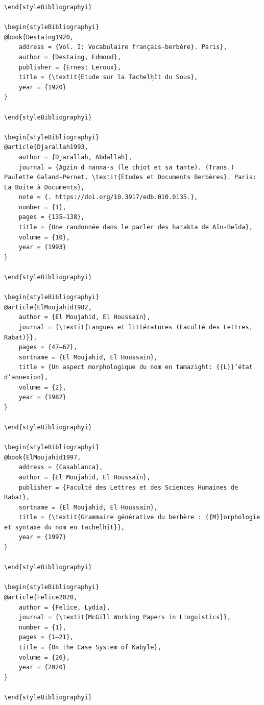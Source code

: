 \documentclass[output=paper]{langscibook}
\begin{document}
\begin{verbatim}
\end{styleBibliographyi}

\begin{styleBibliographyi}
@book{Destaing1920,
	address = {Vol. I: Vocabulaire français-berbère}. Paris},
	author = {Destaing, Edmond},
	publisher = {Ernest Leroux},
	title = {\textit{Etude sur la Tachelḥît du Sous},
	year = {1920}
}

\end{styleBibliographyi}

\begin{styleBibliographyi}
@article{Djarallah1993,
	author = {Djarallah, Abdallah},
	journal = {Agzin d nanna-s (le chiot et sa tante). (Trans.) Paulette Galand-Pernet. \textit{Études et Documents Berbères}. Paris: La Boite à Documents},
	note = {. https://doi.org/10.3917/edb.010.0135.},
	number = {1},
	pages = {135–138},
	title = {Une randonnée dans le parler des harakta de Aïn-Beïda},
	volume = {10},
	year = {1993}
}

\end{styleBibliographyi}

\begin{styleBibliographyi}
@article{ElMoujahid1982,
	author = {El Moujahid, El Houssaïn},
	journal = {\textit{Langues et littératures (Faculté des Lettres, Rabat)}},
	pages = {47–62},
	sortname = {El Moujahid, El Houssain},
	title = {Un aspect morphologique du nom en tamazight: {{L}}’état d’annexion},
	volume = {2},
	year = {1982}
}

\end{styleBibliographyi}

\begin{styleBibliographyi}
@book{ElMoujahid1997,
	address = {Casablanca},
	author = {El Moujahid, El Houssaïn},
	publisher = {Faculté des Lettres et des Sciences Humaines de Rabat},
	sortname = {El Moujahid, El Houssain},
	title = {\textit{Grammaire générative du berbère : {{M}}orphologie et syntaxe du nom en tachelhit}},
	year = {1997}
}

\end{styleBibliographyi}

\begin{styleBibliographyi}
@article{Felice2020,
	author = {Felice, Lydia},
	journal = {\textit{McGill Working Papers in Linguistics}},
	number = {1},
	pages = {1–21},
	title = {On the Case System of Kabyle},
	volume = {26},
	year = {2020}
}

\end{styleBibliographyi}


\end{verbatim}
\end{document}
